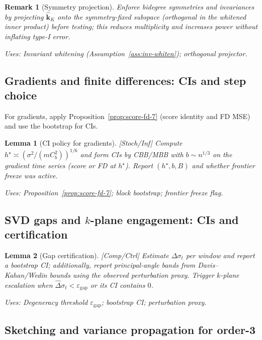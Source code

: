 \documentclass[10pt]{article}
\newcommand{\uses}[1]{\par\smallskip\noindent\textit{Uses: }#1\par\smallskip}
\newtheorem{lemma}{Lemma}
\newtheorem{remark}{Remark}
\begin{document}
\begin{remark}[Symmetry projection]\label{rem:symm-proj}
Enforce bidegree symmetries and invariances by projecting $\widehat{\mathbf k}_K$ onto the symmetry-fixed subspace (orthogonal in the whitened inner product) before testing; this reduces multiplicity and increases power without inflating type-I error.
\uses{Invariant whitening (Assumption~\ref{ass:inv-whiten}); orthogonal projector.}
\end{remark}

\subsection{Gradients and finite differences: CIs and step choice}\label{subsec:grad-ci}

For gradients, apply Proposition~\ref{prop:score-fd-7} (score identity and FD MSE) and use the bootstrap for CIs.

\begin{lemma}[CI policy for gradients]\label{lem:grad-ci}
\emph{[\textup{Stoch/Inf}]}
Compute $h^\star\asymp(\sigma^2/(mC_b^2))^{1/6}$ and form CIs by CBB/MBB with $b\sim n^{1/3}$ on the gradient time series (score or FD at $h^\star$).
Report $(h^\star, b, B)$ and whether \emph{frontier freeze} was active.
\uses{Proposition~\ref{prop:score-fd-7}; block bootstrap; frontier freeze flag.}
\end{lemma}

\subsection{SVD gaps and $k$-plane engagement: CIs and certification}\label{subsec:gap-ci}

\begin{lemma}[Gap certification]\label{lem:gap-ci}
\emph{[\textup{Comp/Ctrl}]}
Estimate $\Delta\sigma_t$ per window and report a bootstrap CI; additionally, report principal-angle bands from Davis–Kahan/Wedin bounds using the observed perturbation proxy. Trigger $k$-plane escalation when $\widehat\Delta\sigma_t<\varepsilon_{\mathrm{gap}}$ or its CI contains $0$.
\uses{Degeneracy threshold $\varepsilon_{\mathrm{gap}}$; bootstrap CI; perturbation proxy.}
\end{lemma}

\subsection{Sketching and variance propagation for order-3}\label{subsec:sketch}
\end{document}

